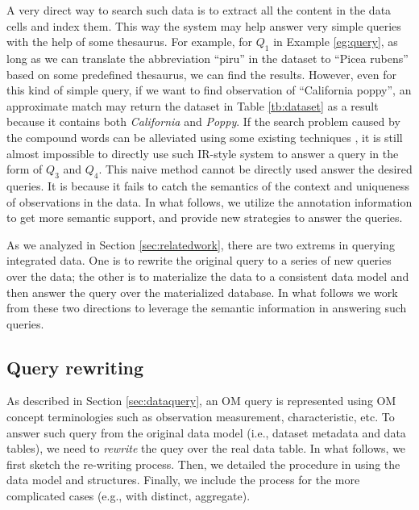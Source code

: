 \documentclass[conference]{IEEEtran}
\begin{document}
A very direct way to search such data is to extract all the content in
the data cells and index them. This way the system may help answer
very simple queries with the help of some thesaurus. 
For example, for $Q_1$ in Example \ref{eg:query}, as long as we can
translate the abbreviation ``piru'' in the dataset to ``Picea rubens''
based on some predefined thesaurus, we can find the results. 
However, even for this kind of simple query, if we want to find
observation of ``California poppy'', an approximate match may return
the dataset in Table \ref{tb:dataset} as a result because it contains
both {\em California} and {\em Poppy}.
If the search problem caused by the compound words can be alleviated using some existing
techniques \cite{***}, %
it is still almost impossible to directly use such IR-style system to answer a query
in the form of $Q_3$ and $Q_4$. 
This naive method cannot be directly used answer the desired queries. It is because it
fails to catch the semantics of the context and uniqueness of observations in the data. 
In what follows, we utilize the annotation information to get
more semantic support, and provide new strategies to answer the
queries. 

As we analyzed in Section \ref{sec:relatedwork}, there are two extrems
in querying integrated data. 
One is to rewrite the original query to a series of new queries over
the data; the other is to materialize the data to a consistent data
model and then answer the query over the materialized database. 
In what follows we work from these two directions to leverage the
semantic information in answering such queries. 

\subsection{Query rewriting}\label{sec:queryrewrite}

As described in Section \ref{sec:dataquery}, 
an OM query is represented using 
OM concept terminologies such as observation
measurement, characteristic, etc. 
To answer such query from the original data model (i.e., dataset
metadata and data tables), we need to {\em rewrite} the quey over the
real data table. 
In what follows, we first sketch the re-writing process. Then, we
detailed the procedure in using the data model and
structures. Finally, we include the process for the more complicated
cases (e.g., with distinct, aggregate). 
\end{document}

